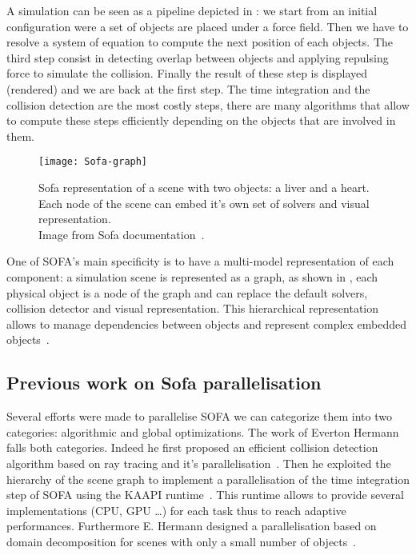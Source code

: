 A simulation can be seen as a pipeline depicted in : we
start from an initial configuration were a set of objects are placed under a
force field. Then we have to resolve a system of equation to compute the next
position of each objects. The third step consist in detecting overlap between
objects and applying repulsing force to simulate the collision.  Finally the
result of these step is displayed (rendered) and we are back at the first
step. The time integration and the collision detection are the most costly
steps, there are many algorithms that allow to compute these steps efficiently
depending on the objects that are involved in them.

\begin{figure}[htb]
    \centering
    \texttt{[image: Sofa-graph]}
    \caption[Example of Sofa scene graph]{Sofa representation of a scene with two objects: a liver and a
        heart. Each node of the scene can embed it's own set of solvers and
        visual representation.\\
        Image from Sofa documentation~\cite{SOFA16Sofa}.}
    \label{fig:sofa-tree}
\end{figure}

One of \gls{SOFA}'s main specificity is to have a multi-model representation
of each component: a simulation scene is represented as a graph, as shown in
, each physical object is a node of the graph and can replace
the default solvers, collision detector and visual representation. This
hierarchical representation allows to manage dependencies between objects and
represent complex embedded objects~\cite{Nesme09Preserving,Faure11Sparse}.

\subsection{Previous work on Sofa parallelisation}

Several efforts were made to parallelise \gls{SOFA} we can categorize them
into two categories: algorithmic and global optimizations. The work of Everton
Hermann~\cite{Hermann10Simulations} falls both categories. Indeed he first
proposed an efficient collision detection algorithm based on ray tracing and
it's parallelisation~\cite{Hermann08Raytraced}. Then he exploited the
hierarchy of the scene graph to implement a parallelisation of the time
integration step of \gls{SOFA} using the \gls{KAAPI}
runtime~\cite{Gautier07KAAPI}. This runtime allows to provide several
implementations (\gls{CPU}, \gls{GPU} \ldots) for each task thus to reach
adaptive performances. Furthermore E. Hermann designed a parallelisation based
on domain decomposition for scenes with only a small number of
objects~\cite{Hermann09Interactive}.

